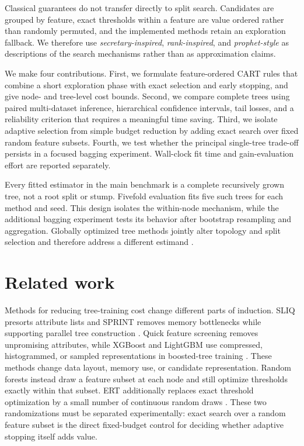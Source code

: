 \documentclass[final,5p,times,twocolumn]{elsarticle}
\begin{document}
Classical guarantees do not transfer directly to split search. Candidates are grouped by feature, exact thresholds within a feature are value ordered rather than randomly permuted, and the implemented methods retain an exploration fallback. We therefore use \emph{secretary-inspired}, \emph{rank-inspired}, and \emph{prophet-style} as descriptions of the search mechanisms rather than as approximation claims.

We make four contributions. First, we formulate feature-ordered CART rules that combine a short exploration phase with exact selection and early stopping, and give node- and tree-level cost bounds. Second, we compare complete trees using paired multi-dataset inference, hierarchical confidence intervals, tail losses, and a reliability criterion that requires a meaningful time saving. Third, we isolate adaptive selection from simple budget reduction by adding exact search over fixed random feature subsets. Fourth, we test whether the principal single-tree trade-off persists in a focused bagging experiment. Wall-clock fit time and gain-evaluation effort are reported separately.

Every fitted estimator in the main benchmark is a complete recursively grown tree, not a root split or stump. Fivefold evaluation fits five such trees for each method and seed. This design isolates the within-node mechanism, while the additional bagging experiment tests its behavior after bootstrap resampling and aggregation. Globally optimized tree methods jointly alter topology and split selection and therefore address a different estimand \cite{bertsimas2017optimal,babbar2025split}.

\section{Related work}
\label{sec:related}

Methods for reducing tree-training cost change different parts of induction. SLIQ presorts attribute lists and SPRINT removes memory bottlenecks while supporting parallel tree construction \cite{mehta1996sliq,shafer1996sprint}. Quick feature screening removes unpromising attributes, while XGBoost and LightGBM use compressed, histogrammed, or sampled representations in boosted-tree training \cite{appel2013quickly,chen2016xgboost,ke2017lightgbm}. These methods change data layout, memory use, or candidate representation. Random forests instead draw a feature subset at each node and still optimize thresholds exactly within that subset. ERT additionally replaces exact threshold optimization by a small number of continuous random draws \cite{breiman2001rf,geurts2006extra}. These two randomizations must be separated experimentally: exact search over a random feature subset is the direct fixed-budget control for deciding whether adaptive stopping itself adds value.
\end{document}
